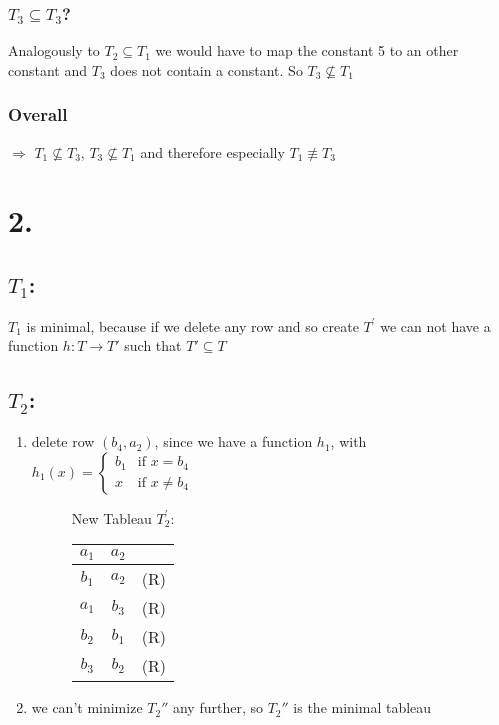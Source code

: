\documentclass[12pt]{article}
\begin{document}
	\subsubsection*{$T_3 \subseteq T_3$?}
	Analogously to $T_2 \subseteq T_1$ we would have to map the constant 5 to an other constant and $T_3$ does not contain a constant. So $T_3 \not \subseteq T_1$
	\subsubsection*{Overall}
	$\Rightarrow$ $T_1\not\subseteq T_3$, $T_3 \not\subseteq T_1$ and therefore especially $T_1 \not\equiv T_3$ 
	
	\section*{2.}
	\subsection*{$T_1$:}
	$T_1$ is minimal, because if we delete any row and so create $T^\prime$ we can not have a function $h:T\rightarrow T'$ such that $T'\subseteq T$
	
	\subsection*{$T_2$:}
	\begin{enumerate}
		\item delete row $(b_4, a_2)$, since we have a function $h_1$, with $h_1(x) =
			\begin{cases}
				b_1 & \text{if }x=b_4\\
				x & \text{if }x \neq b_4
			\end{cases}$
			\begin{figure}[H]
				\centering
				New Tableau $T_2^\prime$: \\
				\begin{tabular}{c c c}
					\hline
					$a_1$ & $a_2$ & \\ \hline
					$b_1$ & $a_2$ & (R) \\
					$a_1$ & $b_3$ & (R) \\
					$b_2$ & $b_1$ & (R) \\
					$b_3$ & $b_2$ & (R) \\
				\end{tabular}
			\end{figure}	
		\item we can't minimize $T_2''$ any further, so $T_2''$ is the minimal tableau
	\end{enumerate}
\end{document}
